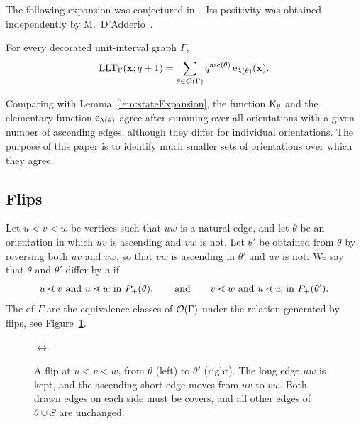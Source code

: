 The following expansion was conjectured
in~\cite{GarsiaHaglundQiuRomero2019,Alexandersson2019llt}.
Its positivity was obtained independently by M.~D'Adderio~\cite{DAdderio2020}.

\begin{theorem}
\label{thm:AS}
For every decorated unit-interval graph $\Gamma$,
\[
 \operatorname{LLT}_\Gamma(\mathbf{x};q+1)=\sum_{\theta\in\mathcal{O}(\Gamma)}q^{\operatorname{asc}(\theta)}\,
 \mathrm{e}_{\lambda(\theta)}(\mathbf{x}).
\]
\end{theorem}

Comparing with Lemma~\ref{lem:stateExpansion}, the function
$\mathrm{K}_{\theta}$ and the elementary function $\mathrm{e}_{\lambda(\theta)}$
agree after summing over all orientations with a given number of ascending
edges, although they differ for individual orientations.
The purpose of this paper is to identify much smaller sets of orientations over
which they agree.

\subsection{Flips}

\begin{definition}\label{def:flip}
Let $u<v<w$ be vertices such that $uw$ is a natural edge, and let $\theta$ be an
orientation in which $uv$ is ascending and $vw$ is not.
Let $\theta'$ be obtained from $\theta$ by reversing both $uv$ and $vw$, so that
$vw$ is ascending in $\theta'$ and $uv$ is not.
We say that $\theta$ and $\theta'$ differ by a  if
\[
 u\lessdot v \text{ and } u\lessdot w \text{ in } P_{+}(\theta),
 \qquad\text{and}\qquad
 v\lessdot w \text{ and } u\lessdot w \text{ in } P_{+}(\theta').
\]
The  of $\Gamma$ are the equivalence classes of
$\mathcal{O}(\Gamma)$ under the relation generated by flips, see
Figure~\ref{fig:flip}.
\end{definition}

\begin{figure}[!ht]
\centering
{}
\qquad$\longleftrightarrow$\qquad
{}
\caption{A flip at $u<v<w$, from $\theta$ (left) to $\theta'$ (right).
The long edge $uw$ is kept, and the ascending short edge moves from $uv$ to
$vw$.
Both drawn edges on each side must be covers, and all other edges of
$\theta\cup S$ are unchanged.}
\label{fig:flip}
\end{figure}

